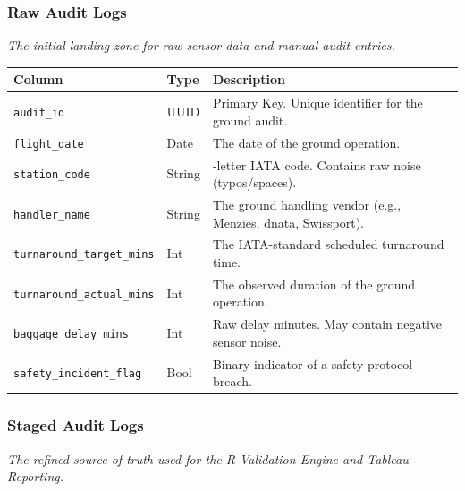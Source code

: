 \documentclass[
  letterpaper,
  DIV=11,
  numbers=noendperiod]{scrartcl}
\begin{document}
\subsubsection{Raw Audit Logs}

\emph{The initial landing zone for raw sensor data and manual audit
entries.}

\begin{longtable}[]{@{}
  >{\raggedright\arraybackslash}p{}
  >{\raggedright\arraybackslash}p{}
  >{\raggedright\arraybackslash}p{}@{}}
\toprule\noalign{}
\begin{minipage}[b]{\linewidth}\raggedright
Column
\end{minipage} & \begin{minipage}[b]{\linewidth}\raggedright
Type
\end{minipage} & \begin{minipage}[b]{\linewidth}\raggedright
Description
\end{minipage} \\
\midrule\noalign{}
\endhead
\bottomrule\noalign{}
\endlastfoot
\texttt{audit\_id} & UUID & Primary Key. Unique identifier for the
ground audit. \\
\texttt{flight\_date} & Date & The date of the ground operation. \\
\texttt{station\_code} & String & 3-letter IATA code. Contains raw noise
(typos/spaces). \\
\texttt{handler\_name} & String & The ground handling vendor (e.g.,
Menzies, dnata, Swissport). \\
\texttt{turnaround\_target\_mins} & Int & The IATA-standard scheduled
turnaround time. \\
\texttt{turnaround\_actual\_mins} & Int & The observed duration of the
ground operation. \\
\texttt{baggage\_delay\_mins} & Int & Raw delay minutes. May contain
negative sensor noise. \\
\texttt{safety\_incident\_flag} & Bool & Binary indicator of a safety
protocol breach. \\
\end{longtable}

\subsubsection{Staged Audit Logs}

\emph{The refined source of truth used for the R Validation Engine and
Tableau Reporting.}
\end{document}
